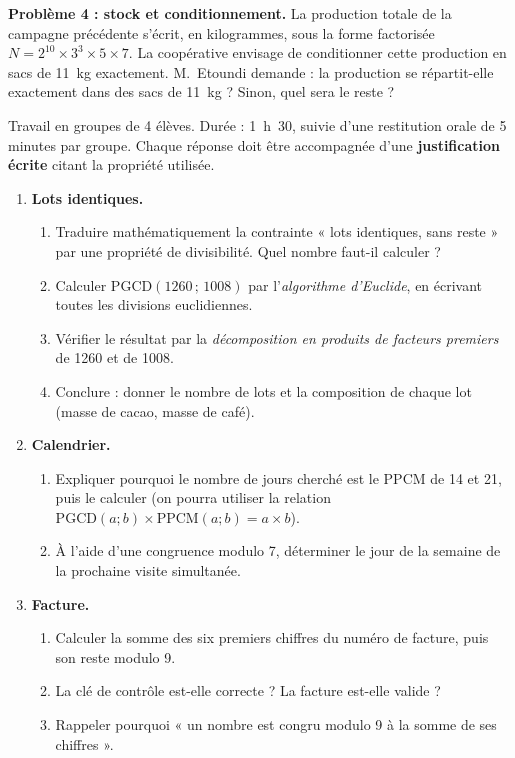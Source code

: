 \documentclass[11pt]{article}
\newcounter{popsec}
\newcounter{popsub}
\newcommand{\courssub}[1]{%
  \stepcounter{popsub}%
  \par\vspace{9pt}\noindent{\popxbold\fontsize{11.5}{13}\selectfont\color{popink}{\color{poporange}\thepopsec.\thepopsub}\hspace{6pt}#1}\par\nopagebreak\vspace{4pt}
}
\begin{document}
\textbf{Problème 4 : stock et conditionnement.} La production totale de la campagne précédente s'écrit, en kilogrammes, sous la forme factorisée $N = 2^{10}\times 3^{3}\times 5\times 7$. La coopérative envisage de conditionner cette production en sacs de \SI{11}{\kg} exactement. M.~Etoundi demande : la production se répartit-elle exactement dans des sacs de \SI{11}{\kg} ? Sinon, quel sera le reste ?

\courssub{Consignes}

Travail en groupes de 4 élèves. Durée : 1~h~30, suivie d'une restitution orale de 5 minutes par groupe. Chaque réponse doit être accompagnée d'une \textbf{justification écrite} citant la propriété utilisée.

\begin{enumerate}
\item \textbf{Lots identiques.}
\begin{enumerate}
\item Traduire mathématiquement la contrainte « lots identiques, sans reste » par une propriété de divisibilité. Quel nombre faut-il calculer ?
\item Calculer $\mathrm{PGCD}(\num{1260}\,;\,\num{1008})$ par l'\emph{algorithme d'Euclide}, en écrivant toutes les divisions euclidiennes.
\item Vérifier le résultat par la \emph{décomposition en produits de facteurs premiers} de \num{1260} et de \num{1008}.
\item Conclure : donner le nombre de lots et la composition de chaque lot (masse de cacao, masse de café).
\end{enumerate}
\item \textbf{Calendrier.}
\begin{enumerate}
\item Expliquer pourquoi le nombre de jours cherché est le PPCM de 14 et 21, puis le calculer (on pourra utiliser la relation $\mathrm{PGCD}(a;b)\times\mathrm{PPCM}(a;b)=a\times b$).
\item À l'aide d'une congruence modulo 7, déterminer le jour de la semaine de la prochaine visite simultanée.
\end{enumerate}
\item \textbf{Facture.}
\begin{enumerate}
\item Calculer la somme des six premiers chiffres du numéro de facture, puis son reste modulo 9.
\item La clé de contrôle est-elle correcte ? La facture est-elle valide ?
\item Rappeler pourquoi « un nombre est congru modulo 9 à la somme de ses chiffres ».

\end{enumerate}
\end{enumerate}
\end{document}
